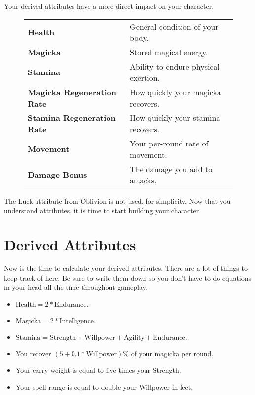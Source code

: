 Your derived attributes have a more direct impact on your character.
\begin{figure}[h]
\begin{tabular}[h]{p{}p{}}
	\rowcolor{gray!25}
	\textbf{Health} & General condition of your body.\\
	\textbf{Magicka} & Stored magical energy.\\
	\textbf{Stamina} & Ability to endure physical exertion.\\
	\textbf{Magicka Regeneration Rate} & How quickly your magicka recovers.\\
	\textbf{Stamina Regeneration Rate} & How quickly your stamina recovers.\\
	\textbf{Movement} & Your per-round rate of movement.\\
	\textbf{Damage Bonus} & The damage you add to attacks.\\
\end{tabular}
\end{figure}

The Luck attribute from Oblivion is not used, for simplicity. Now that you understand attributes, it is time to start building your character.





\section{Derived Attributes}
Now is the time to calculate your derived attributes. There are a lot of things to keep track of here. Be sure to write them down so you don't have to do equations in your head all the time throughout gameplay.
\begin{itemize}
	\item $\text{Health}=2*\text{Endurance}$.
	\item $\text{Magicka}=2*\text{Intelligence}$.
	\item $\text{Stamina}=\text{Strength}+\text{Willpower}+\text{Agility}+\text{Endurance}$.
	\item You recover $(5+0.1*\text{Willpower})\%$ of your magicka per round.
	\item Your carry weight is equal to five times your Strength.
	\item Your spell range is equal to double your Willpower in feet. 
\end{itemize}

